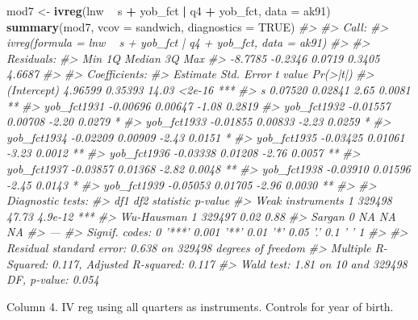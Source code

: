 \documentclass[]{book}
\newenvironment{Shaded}{\begin{snugshade}}{\end{snugshade}}
\newcommand{\KeywordTok}[1]{\textcolor[rgb]{0.13,0.29,0.53}{\textbf{#1}}}
\newcommand{\DataTypeTok}[1]{\textcolor[rgb]{0.13,0.29,0.53}{#1}}
\newcommand{\StringTok}[1]{\textcolor[rgb]{0.31,0.60,0.02}{#1}}
\newcommand{\CommentTok}[1]{\textcolor[rgb]{0.56,0.35,0.01}{\textit{#1}}}
\newcommand{\OtherTok}[1]{\textcolor[rgb]{0.56,0.35,0.01}{#1}}
\newcommand{\OperatorTok}[1]{\textcolor[rgb]{0.81,0.36,0.00}{\textbf{#1}}}
\newcommand{\NormalTok}[1]{#1}
\theoremstyle{definition}
\theoremstyle{definition}
\theoremstyle{definition}
\theoremstyle{remark}
\begin{document}
\begin{Shaded}
\begin{Highlighting}[]
\NormalTok{mod7 <-}\StringTok{ }\KeywordTok{ivreg}\NormalTok{(lnw }\OperatorTok{~}\StringTok{ }\NormalTok{s }\OperatorTok{+}\StringTok{ }\NormalTok{yob_fct }\OperatorTok{|}\StringTok{ }\NormalTok{q4 }\OperatorTok{+}\StringTok{ }\NormalTok{yob_fct, }\DataTypeTok{data =}\NormalTok{ ak91)}
\KeywordTok{summary}\NormalTok{(mod7, }\DataTypeTok{vcov =}\NormalTok{ sandwich, }\DataTypeTok{diagnostics =} \OtherTok{TRUE}\NormalTok{)}
\CommentTok{#> }
\CommentTok{#> Call:}
\CommentTok{#> ivreg(formula = lnw ~ s + yob_fct | q4 + yob_fct, data = ak91)}
\CommentTok{#> }
\CommentTok{#> Residuals:}
\CommentTok{#>     Min      1Q  Median      3Q     Max }
\CommentTok{#> -8.7785 -0.2346  0.0719  0.3405  4.6687 }
\CommentTok{#> }
\CommentTok{#> Coefficients:}
\CommentTok{#>             Estimate Std. Error t value Pr(>|t|)    }
\CommentTok{#> (Intercept)  4.96599    0.35393   14.03   <2e-16 ***}
\CommentTok{#> s            0.07520    0.02841    2.65   0.0081 ** }
\CommentTok{#> yob_fct1931 -0.00696    0.00647   -1.08   0.2819    }
\CommentTok{#> yob_fct1932 -0.01557    0.00708   -2.20   0.0279 *  }
\CommentTok{#> yob_fct1933 -0.01855    0.00833   -2.23   0.0259 *  }
\CommentTok{#> yob_fct1934 -0.02209    0.00909   -2.43   0.0151 *  }
\CommentTok{#> yob_fct1935 -0.03425    0.01061   -3.23   0.0012 ** }
\CommentTok{#> yob_fct1936 -0.03338    0.01208   -2.76   0.0057 ** }
\CommentTok{#> yob_fct1937 -0.03857    0.01368   -2.82   0.0048 ** }
\CommentTok{#> yob_fct1938 -0.03910    0.01596   -2.45   0.0143 *  }
\CommentTok{#> yob_fct1939 -0.05053    0.01705   -2.96   0.0030 ** }
\CommentTok{#> }
\CommentTok{#> Diagnostic tests:}
\CommentTok{#>                     df1    df2 statistic p-value    }
\CommentTok{#> Weak instruments      1 329498     47.73 4.9e-12 ***}
\CommentTok{#> Wu-Hausman            1 329497      0.02    0.88    }
\CommentTok{#> Sargan                0     NA        NA      NA    }
\CommentTok{#> ---}
\CommentTok{#> Signif. codes:  0 '***' 0.001 '**' 0.01 '*' 0.05 '.' 0.1 ' ' 1}
\CommentTok{#> }
\CommentTok{#> Residual standard error: 0.638 on 329498 degrees of freedom}
\CommentTok{#> Multiple R-Squared: 0.117,   Adjusted R-squared: 0.117 }
\CommentTok{#> Wald test: 1.81 on 10 and 329498 DF,  p-value: 0.054}
\end{Highlighting}
\end{Shaded}

Column 4. IV reg using all quarters as instruments. Controls for year of
birth.
\end{document}
